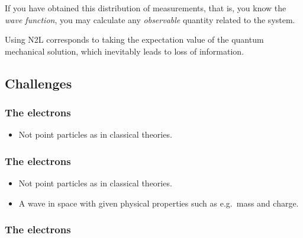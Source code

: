\documentclass[
paper=128mm:96mm, %
fontsize=11pt, %
pagesize, %
parskip=half-, %
]{scrartcl} %
\theoremstyle{mythmstyle} %
\begin{document}
\clearpage

If you have obtained this distribution of measurements, that is, you know the \textit{wave function}, you may calculate any \textit{observable} quantity related to the system.

Using N2L corresponds to taking the expectation value of the quantum mechanical solution, which inevitably leads to loss of information.


\clearpage



\subsection{Challenges}

\clearpage


\subsubsection*{The electrons}

\begin{itemize}
\item  Not point particles as in classical theories.
\end{itemize}

\clearpage




\subsubsection*{The electrons}

\begin{itemize}
\item  Not point particles as in classical theories.
\item  A wave in space with given physical properties such as e.g.~mass and charge.
\end{itemize}

\clearpage




\subsubsection*{The electrons}
\end{document}
